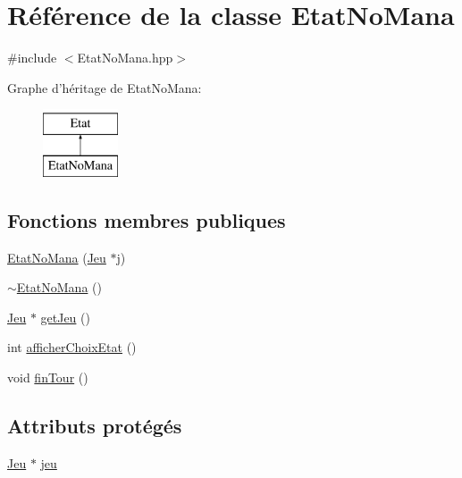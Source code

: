 \hypertarget{class_etat_no_mana}{\section{Référence de la classe Etat\-No\-Mana}
\label{class_etat_no_mana}
}


{\ttfamily \#include $<$Etat\-No\-Mana.\-hpp$>$}

Graphe d'héritage de Etat\-No\-Mana\-:\begin{figure}[H]
\begin{center}
\leavevmode
\includegraphics[height=2.000000cm]{class_etat_no_mana}
\end{center}
\end{figure}
\subsection*{Fonctions membres publiques}
\begin{DoxyCompactItemize}
\item 
\hyperlink{class_etat_no_mana_a506d5de276476b23f9c86864b4c439fa}{Etat\-No\-Mana} (\hyperlink{class_jeu}{Jeu} $\ast$j)
\item 
\hyperlink{class_etat_no_mana_aaae2ecdedcef4451b0a0f7c88aad4c71}{$\sim$\-Etat\-No\-Mana} ()
\item 
\hyperlink{class_jeu}{Jeu} $\ast$ \hyperlink{class_etat_no_mana_a153d0656498f8e15d0c550fc4898f5fe}{get\-Jeu} ()
\item 
int \hyperlink{class_etat_no_mana_aa67bb9f558eaef0d07939a4747d12192}{afficher\-Choix\-Etat} ()
\item 
void \hyperlink{class_etat_no_mana_a14567fee07c6c1a541885fcf2499cd56}{fin\-Tour} ()
\end{DoxyCompactItemize}
\subsection*{Attributs protégés}
\begin{DoxyCompactItemize}
\item 
\hyperlink{class_jeu}{Jeu} $\ast$ \hyperlink{class_etat_no_mana_a8ddcdb9981a36c8baa31d1979272ff72}{jeu}
\end{DoxyCompactItemize}


